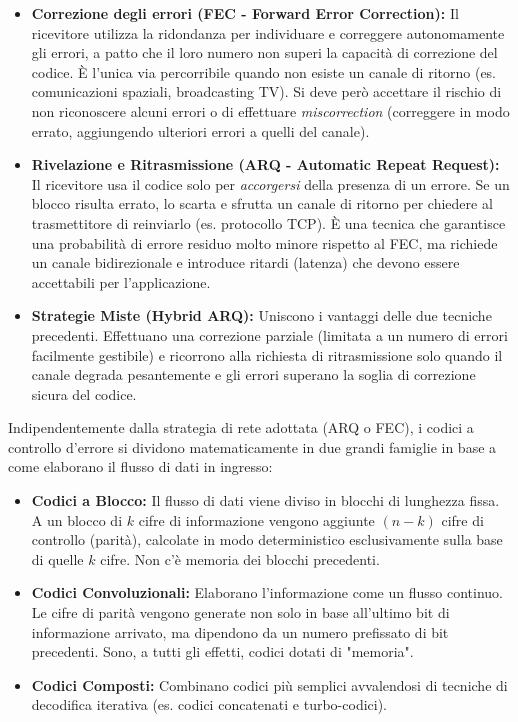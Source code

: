 \begin{itemize}
    \item \textbf{Correzione degli errori (FEC - Forward Error Correction):} 
    Il ricevitore utilizza la ridondanza per individuare e correggere autonomamente gli errori, a patto che il loro numero non superi la capacità di correzione del codice. È l'unica via percorribile quando non esiste un canale di ritorno (es. comunicazioni spaziali, broadcasting TV). Si deve però accettare il rischio di non riconoscere alcuni errori o di effettuare \textit{miscorrection} (correggere in modo errato, aggiungendo ulteriori errori a quelli del canale).
    
    \item \textbf{Rivelazione e Ritrasmissione (ARQ - Automatic Repeat Request):} 
    Il ricevitore usa il codice solo per \textit{accorgersi} della presenza di un errore. Se un blocco risulta errato, lo scarta e sfrutta un canale di ritorno per chiedere al trasmettitore di reinviarlo (es. protocollo TCP). È una tecnica che garantisce una probabilità di errore residuo molto minore rispetto al FEC, ma richiede un canale bidirezionale e introduce ritardi (latenza) che devono essere accettabili per l'applicazione.
    
    \item \textbf{Strategie Miste (Hybrid ARQ):} 
    Uniscono i vantaggi delle due tecniche precedenti. Effettuano una correzione parziale (limitata a un numero di errori facilmente gestibile) e ricorrono alla richiesta di ritrasmissione solo quando il canale degrada pesantemente e gli errori superano la soglia di correzione sicura del codice.
\end{itemize}
Indipendentemente dalla strategia di rete adottata (ARQ o FEC), i codici a controllo d'errore si dividono matematicamente in due grandi famiglie in base a come elaborano il flusso di dati in ingresso:
\begin{itemize}
    \item \textbf{Codici a Blocco:} Il flusso di dati viene diviso in blocchi di lunghezza fissa. A un blocco di $k$ cifre di informazione vengono aggiunte $(n-k)$ cifre di controllo (parità), calcolate in modo deterministico esclusivamente sulla base di quelle $k$ cifre. Non c'è memoria dei blocchi precedenti.
    \item \textbf{Codici Convoluzionali:} Elaborano l'informazione come un flusso continuo. Le cifre di parità vengono generate non solo in base all'ultimo bit di informazione arrivato, ma dipendono da un numero prefissato di bit precedenti. Sono, a tutti gli effetti, codici dotati di "memoria".
    \item \textbf{Codici Composti:} Combinano codici più semplici avvalendosi di tecniche di decodifica iterativa (es. codici concatenati e turbo-codici).
\end{itemize}

